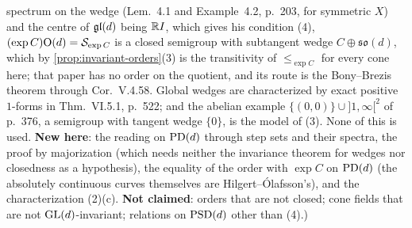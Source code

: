 \begin{theorem}
{spectrum on the wedge (Lem.~4.1 and Example~4.2, p.~203, for symmetric $X$) and the centre of $\mathfrak{gl}(d)$ being
$\mathbb{R} I$, which gives his condition (4), $(\exp C)\mathrm{O}(d) = \mathcal S_{\exp C}$ is a closed semigroup with subtangent
wedge $C \oplus \mathfrak{so}(d)$, which by \ref{prop:invariant-orders}(3) is the transitivity
of $\le_{\exp C}$ for every cone here; that paper has no order on the quotient, and its route is the Bony--Brezis
theorem through Cor.~V.4.58. Global wedges are
characterized by exact positive $1$-forms in  Thm.~VI.5.1, p.~522; and the abelian example $\{(0,0)\} \cup {]1,\infty[^2}$ of
 p.~376, a semigroup with tangent wedge $\{0\}$, is the model of (3). None of this is
used. \textbf{New here}: the reading on $\mathrm{PD}(d)$ through step sets and their spectra, the proof by
majorization (which needs neither the invariance theorem for wedges nor closedness as a hypothesis), the
equality of the order with $\exp C$ on $\mathrm{PD}(d)$ (the absolutely continuous curves
themselves are Hilgert--Ólafsson's), and the
characterization (2)(c). \textbf{Not claimed}: orders that are not closed; cone fields that are not
$\mathrm{GL}(d)$-invariant; relations on $\mathrm{PSD}(d)$ other than (4).)}
\end{theorem}

